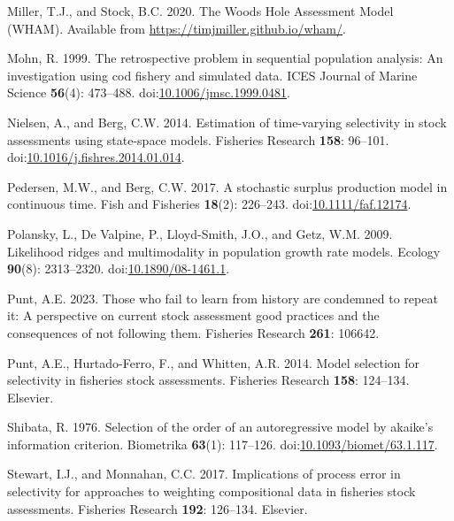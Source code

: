 \documentclass[
  12pt,
]{article}
\newlength{\cslhangindent}
\newlength{\cslentryspacingunit} %
\newenvironment{CSLReferences}[2] %
 {%
  \setlength{\parindent}{0pt}
  \ifodd #1
  \let\oldpar\par
  \def\par{\hangindent=\cslhangindent\oldpar}
  \fi
  \setlength{\parskip}{#2\cslentryspacingunit}
 }%
 {}
\begin{document}
\begin{CSLReferences}{1}{0}
\leavevmode{}%
Miller, T.J., and Stock, B.C. 2020. The {Woods Hole Assessment Model}
({WHAM}). Available from \url{https://timjmiller.github.io/wham/}.

\leavevmode{}%
Mohn, R. 1999. The retrospective problem in sequential population
analysis: An investigation using cod fishery and simulated data. ICES
Journal of Marine Science \textbf{56}(4): 473--488.
doi:\href{https://doi.org/10.1006/jmsc.1999.0481}{10.1006/jmsc.1999.0481}.

\leavevmode{}%
Nielsen, A., and Berg, C.W. 2014. Estimation of time-varying selectivity
in stock assessments using state-space models. Fisheries Research
\textbf{158}: 96--101.
doi:\href{https://doi.org/10.1016/j.fishres.2014.01.014}{10.1016/j.fishres.2014.01.014}.

\leavevmode{}%
Pedersen, M.W., and Berg, C.W. 2017. A stochastic surplus production
model in continuous time. Fish and Fisheries \textbf{18}(2): 226--243.
doi:\href{https://doi.org/10.1111/faf.12174}{10.1111/faf.12174}.

\leavevmode{}%
Polansky, L., De Valpine, P., Lloyd-Smith, J.O., and Getz, W.M. 2009.
Likelihood ridges and multimodality in population growth rate models.
Ecology \textbf{90}(8): 2313--2320.
doi:\href{https://doi.org/10.1890/08-1461.1}{10.1890/08-1461.1}.

\leavevmode{}%
Punt, A.E. 2023. Those who fail to learn from history are condemned to
repeat it: A perspective on current stock assessment good practices and
the consequences of not following them. Fisheries Research \textbf{261}:
106642.

\leavevmode{}%
Punt, A.E., Hurtado-Ferro, F., and Whitten, A.R. 2014. Model selection
for selectivity in fisheries stock assessments. Fisheries Research
\textbf{158}: 124--134. Elsevier.

\leavevmode{}%
Shibata, R. 1976. Selection of the order of an autoregressive model by
akaike's information criterion. Biometrika \textbf{63}(1): 117--126.
doi:\href{https://doi.org/10.1093/biomet/63.1.117}{10.1093/biomet/63.1.117}.

\leavevmode{}%
Stewart, I.J., and Monnahan, C.C. 2017. Implications of process error in
selectivity for approaches to weighting compositional data in fisheries
stock assessments. Fisheries Research \textbf{192}: 126--134. Elsevier.


\end{CSLReferences}
\end{document}
